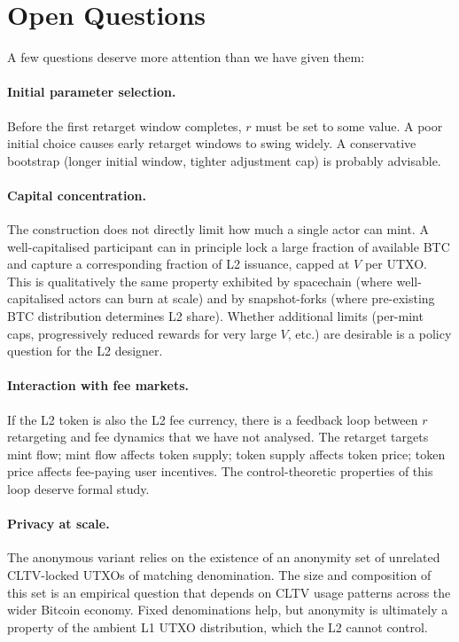 \documentclass[11pt,a4paper]{article}
\begin{document}
\section{Open Questions}

A few questions deserve more attention than we have given them:

\paragraph{Initial parameter selection.} Before the first retarget window completes, $r$ must be set to some value. A poor initial choice causes early retarget windows to swing widely. A conservative bootstrap (longer initial window, tighter adjustment cap) is probably advisable.

\paragraph{Capital concentration.} The construction does not directly limit how much a single actor can mint. A well-capitalised participant can in principle lock a large fraction of available BTC and capture a corresponding fraction of L2 issuance, capped at $V$ per UTXO. This is qualitatively the same property exhibited by spacechain (where well-capitalised actors can burn at scale) and by snapshot-forks (where pre-existing BTC distribution determines L2 share). Whether additional limits (per-mint caps, progressively reduced rewards for very large $V$, etc.) are desirable is a policy question for the L2 designer.

\paragraph{Interaction with fee markets.} If the L2 token is also the L2 fee currency, there is a feedback loop between $r$ retargeting and fee dynamics that we have not analysed. The retarget targets mint flow; mint flow affects token supply; token supply affects token price; token price affects fee-paying user incentives. The control-theoretic properties of this loop deserve formal study.

\paragraph{Privacy at scale.} The anonymous variant relies on the existence of an anonymity set of unrelated CLTV-locked UTXOs of matching denomination. The size and composition of this set is an empirical question that depends on CLTV usage patterns across the wider Bitcoin economy. Fixed denominations help, but anonymity is ultimately a property of the ambient L1 UTXO distribution, which the L2 cannot control.
\end{document}
